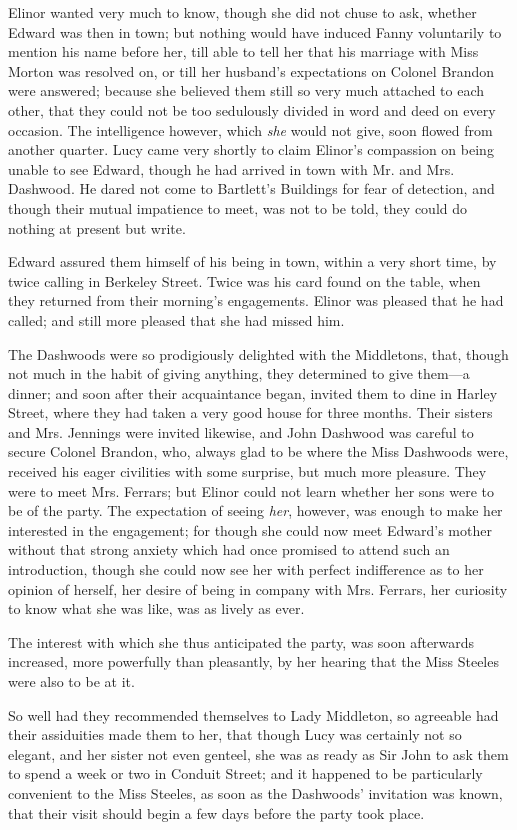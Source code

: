 Elinor wanted very much to know, though she did not chuse to ask, whether Edward was then in town; but nothing would have induced Fanny voluntarily to mention his name before her, till able to tell her that his marriage with Miss Morton was resolved on, or till her husband's expectations on Colonel Brandon were answered; because she believed them still so very much attached to each other, that they could not be too sedulously divided in word and deed on every occasion. The intelligence however, which {\em she} would not give, soon flowed from another quarter. Lucy came very shortly to claim Elinor's compassion on being unable to see Edward, though he had arrived in town with Mr. and Mrs. Dashwood. He dared not come to Bartlett's Buildings for fear of detection, and though their mutual impatience to meet, was not to be told, they could do nothing at present but write.

Edward assured them himself of his being in town, within a very short time, by twice calling in Berkeley Street. Twice was his card found on the table, when they returned from their morning's engagements. Elinor was pleased that he had called; and still more pleased that she had missed him.

The Dashwoods were so prodigiously delighted with the Middletons, that, though not much in the habit of giving anything, they determined to give them---a dinner; and soon after their acquaintance began, invited them to dine in Harley Street, where they had taken a very good house for three months. Their sisters and Mrs. Jennings were invited likewise, and John Dashwood was careful to secure Colonel Brandon, who, always glad to be where the Miss Dashwoods were, received his eager civilities with some surprise, but much more pleasure. They were to meet Mrs. Ferrars; but Elinor could not learn whether her sons were to be of the party. The expectation of seeing {\em her}, however, was enough to make her interested in the engagement; for though she could now meet Edward's mother without that strong anxiety which had once promised to attend such an introduction, though she could now see her with perfect indifference as to her opinion of herself, her desire of being in company with Mrs. Ferrars, her curiosity to know what she was like, was as lively as ever.

The interest with which she thus anticipated the party, was soon afterwards increased, more powerfully than pleasantly, by her hearing that the Miss Steeles were also to be at it.

So well had they recommended themselves to Lady Middleton, so agreeable had their assiduities made them to her, that though Lucy was certainly not so elegant, and her sister not even genteel, she was as ready as Sir John to ask them to spend a week or two in Conduit Street; and it happened to be particularly convenient to the Miss Steeles, as soon as the Dashwoods' invitation was known, that their visit should begin a few days before the party took place.

